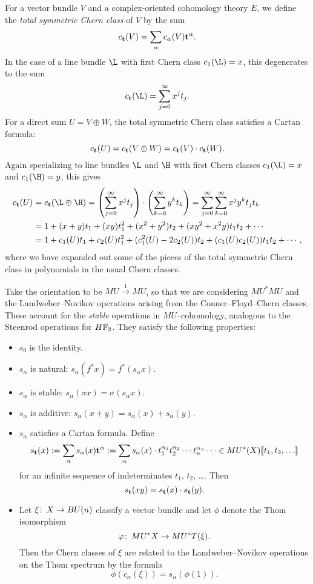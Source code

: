 \begin{remark}
For a vector bundle \(V\) and a complex-oriented cohomology theory \(E\), we define the \textit{total symmetric Chern class} of \(V\) by the sum \[c_{\mathbf t}(V) = \sum_\alpha c_\alpha(V) \mathbf t^{\alpha}.\]  In the case of a line bundle \(\L\) with first Chern class \(c_1(\L) = x\), this degenerates to the sum \[c_{\t}(\L) = \sum_{j=0}^\infty x^j t_j.\]  For a direct sum \(U = V \oplus W\), the total symmetric Chern class satisfies a Cartan formula: \[c_{\mathbf t}(U) = c_{\mathbf t}(V \oplus W) = c_{\mathbf t}(V) \cdot c_{\mathbf t}(W).\]  Again specializing to line bundles \(\L\) and \(\H\) with first Chern classes \(c_1(\L) = x\) and \(c_1(\H) = y\), this gives
\begin{align*}
c_{\t}(U) & = c_{\t}(\L \oplus \H) = \left( \sum_{j=0}^\infty x^j t_j \right) \cdot \left( \sum_{k=0}^\infty y^k t_k \right) = \sum_{j = 0}^{\infty} \sum_{k=0}^\infty x^j y^k t_j t_k \\
& = 1 + (x + y)t_1 + (xy)t_1^2 + (x^2 + y^2)t_2 + (xy^2 + x^2y)t_1 t_2 + \cdots \\
& = 1 + c_1(U)t_1 + c_2(U)t_1^2 + (c_1^2(U) - 2c_2(U))t_2 + (c_1(U) c_2(U))t_1t_2 + \cdots,
\end{align*}
where we have expanded out some of the pieces of the total symmetric Chern class in polynomials in the usual Chern classes.
\end{remark}

\begin{definition}
Take the orientation to be \(MU \xrightarrow{1} MU\), so that we are considering \(MU^* MU\) and the Landweber--Novikov operations arising from the Conner--Floyd--Chern classes.  These account for the \emph{stable} operations in \(MU\)--cohomology, analogous to the Steenrod operations for \(\HFtwo\).  They satisfy the following properties:
\begin{itemize}
\item \(s_0\) is the identity.
\item \(s_\alpha\) is natural: \(s_\alpha(f^* x) = f^*(s_\alpha x)\).
\item \(s_\alpha\) is stable: \(s_\alpha(\sigma x) = \sigma(s_\alpha x)\).
\item \(s_\alpha\) is additive: \(s_\alpha(x + y) = s_\alpha(x) + s_\alpha(y)\).
\item \(s_\alpha\) satisfies a Cartan formula.  Define \[s_{\mathbf t}(x) := \sum_{\alpha} s_\alpha(x) \mathbf t^\alpha := \sum_\alpha s_\alpha(x) \cdot t_1^{\alpha_1} t_2^{\alpha_2} \cdots t_n^{\alpha_n} \cdots \in MU^*(X)\llbracket{t_1, t_2, \ldots}\rrbracket\] for an infinite sequence of indeterminates \(t_1\), \(t_2\), \ldots.  Then \[s_{\mathbf t}(x y) = s_{\mathbf t}(x) \cdot s_{\mathbf t}(y).\]
\item Let \(\xi\colon\thinspace X \to BU(n)\) classify a vector bundle and let \(\phi\) denote the Thom isomorphism \[\varphi\colon\thinspace MU^* X \to MU^* T(\xi).\]  Then the Chern classes of \(\xi\) are related to the Landweber--Novikov operations on the Thom spectrum by the formula \[\phi(c_\alpha(\xi)) = s_\alpha(\phi(1)).\]
\end{itemize}
\end{definition}

